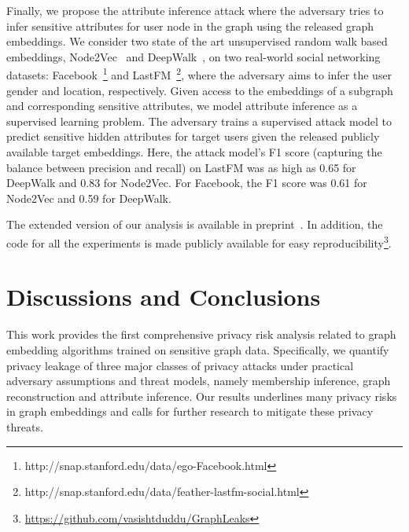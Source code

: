 Finally, we propose the attribute inference attack where the adversary tries to infer sensitive attributes for user node in the graph using the released graph embeddings.
We consider two state of the art unsupervised random walk based embeddings, Node2Vec~\cite{node2vec} and DeepWalk~\cite{deepwalk}, on two real-world social networking datasets: Facebook~\footnote{http://snap.stanford.edu/data/ego-Facebook.html} and LastFM~\footnote{http://snap.stanford.edu/data/feather-lastfm-social.html}, where the adversary aims to infer the user gender and location, respectively.
Given access to the embeddings of a subgraph and corresponding sensitive attributes, we model attribute inference as a supervised learning problem.
The adversary trains a supervised attack model to predict sensitive hidden attributes for target users given the released publicly available target embeddings.
Here, the attack model's F1 score (capturing the balance between precision and recall) on LastFM was as high as 0.65 for DeepWalk and 0.83 for Node2Vec.
For Facebook, the F1 score was 0.61 for Node2Vec and 0.59 for DeepWalk.

The extended version of our analysis is available in preprint~\cite{hal-02956397}.
In addition, the code for all the experiments is made publicly available for easy reproducibility\footnote{\url{https://github.com/vasishtduddu/GraphLeaks}}.


\section{Discussions and Conclusions}
\label{conclusion}


This work provides the first comprehensive privacy risk analysis related to graph embedding algorithms trained on sensitive graph data.
Specifically, we quantify privacy leakage of three major classes of privacy attacks under practical adversary assumptions and threat models, namely membership inference, graph reconstruction and attribute inference.
Our results underlines many privacy risks in graph embeddings and calls for further research to mitigate these privacy threats.


